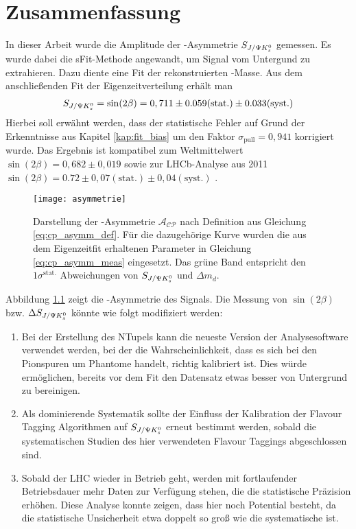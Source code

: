 \chapter{Zusammenfassung}
In dieser Arbeit wurde die Amplitude der \CP-Asymmetrie $S_{J/\Psi K_s^0}$ gemessen. Es wurde dabei die sFit-Methode angewandt, um Signal vom Untergund zu extrahieren. Dazu diente eine Fit der rekonstruierten \Bd-Masse. Aus dem anschließenden Fit der Eigenzeitverteilung erhält man
\begin{align}
S_{J/\Psi K_s^0} = \sin(2\beta) = 0,711 \pm 0.059 (\text{stat.}) \pm 0.033 (\text{syst.})
\end{align}
Hierbei soll erwähnt werden, dass der statistische Fehler auf Grund der Erkenntnisse aus Kapitel \ref{kap:fit_bias} um den Faktor $\sigma_{\text{pull}} = 0,941$ korrigiert wurde. Das Ergebnis ist kompatibel zum Weltmittelwert $\sin(2\beta) = 0,682 \pm 0,019$ \cite{pdg-average} sowie zur LHCb-Analyse aus 2011 $\sin(2\beta) = 0.72 \pm 0,07 (\text{stat.}) \pm 0,04 (\text{syst.})$ \cite{lhcb-paper}. 

\begin{figure}[hptb]
\centering
\texttt{[image: asymmetrie]}
\caption{Darstellung der \CP-Asymmetrie $\mathcal{A_{CP}}$ nach Definition aus Gleichung \ref{eq:cp_asymm_def}. Für die dazugehörige Kurve wurden die aus dem Eigenzeitfit erhaltenen Parameter in Gleichung \ref{eq:cp_asymm_meas} eingesetzt. Das grüne Band entspricht den $1\sigma^{\text{stat.}}$ Abweichungen von $S_{J/\Psi K_s^0}$ und $\Delta m_d$.}
\label{fig:asymmetrie}
\end{figure}

Abbildung \ref{fig:asymmetrie} zeigt die \CP-Asymmetrie des Signals. Die Messung von $\sin(2\beta)$ bzw. $\Delta S_{J/\Psi K_s^0}$ könnte wie folgt modifiziert werden:
\begin{enumerate}
    \item Bei der Erstellung des NTupels kann die neueste Version der Analysesoftware verwendet werden, bei der die Wahrscheinlichkeit, dass es sich bei den Pionspuren um Phantome handelt, richtig kalibriert ist. Dies würde ermöglichen, bereits vor dem Fit den Datensatz etwas besser von Untergrund zu bereinigen.
    \item Als dominierende Systematik sollte der Einfluss der Kalibration der Flavour Tagging Algorithmen auf $S_{J/\Psi K_s^0}$ erneut bestimmt werden, sobald die systematischen Studien des hier verwendeten Flavour Taggings abgeschlossen sind.
    \item Sobald der LHC wieder in Betrieb geht, werden mit fortlaufender Betriebsdauer mehr Daten zur Verfügung stehen, die die statistische Präzision erhöhen. Diese Analyse konnte zeigen, dass hier noch Potential besteht, da die statistische Unsicherheit etwa doppelt so groß wie die systematische ist.
\end{enumerate}
